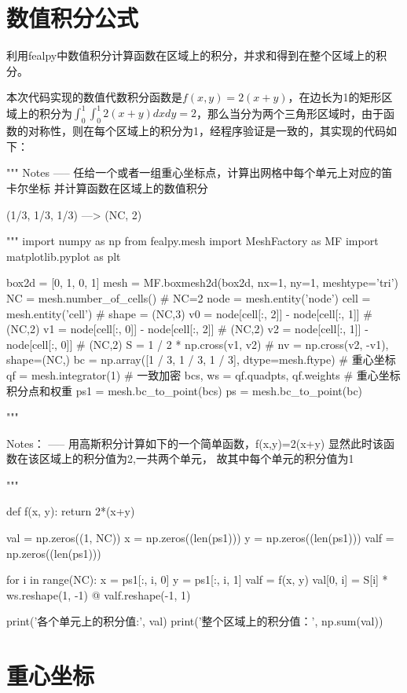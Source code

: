 \documentclass{article}
\begin{document}
\section{数值积分公式}

利用fealpy中数值积分计算函数在区域上的积分，并求和得到在整个区域上的积分。

本次代码实现的数值代数积分函数是$f(x,y)=2(x+y)$，在边长为1的矩形区域上的积分为$\int_0^1\int_0^1 2(x+y)dxdy=2$，那么当分为两个三角形区域时，由于函数的对称性，则在每个区域上的积分为1，经程序验证是一致的，其实现的代码如下：

\begin{python}
"""
Notes
-----
任给一个或者一组重心坐标点，计算出网格中每个单元上对应的笛卡尔坐标
并计算函数在区域上的数值积分

(1/3, 1/3, 1/3)   --->  (NC, 2)

"""
import numpy as np
from fealpy.mesh import MeshFactory as MF
import matplotlib.pyplot as plt

box2d = [0, 1, 0, 1]
mesh = MF.boxmesh2d(box2d, nx=1, ny=1, meshtype='tri')
NC = mesh.number_of_cells()  # NC=2
node = mesh.entity('node')
cell = mesh.entity('cell')  # shape = (NC,3)
v0 = node[cell[:, 2]] - node[cell[:, 1]]  # (NC,2)
v1 = node[cell[:, 0]] - node[cell[:, 2]]  # (NC,2)
v2 = node[cell[:, 1]] - node[cell[:, 0]]  # (NC,2)
S = 1 / 2 * np.cross(v1, v2)  # nv = np.cross(v2, -v1), shape=(NC,)
bc = np.array([1 / 3, 1 / 3, 1 / 3], dtype=mesh.ftype)  # 重心坐标
qf = mesh.integrator(1)  # 一致加密
bcs, ws = qf.quadpts, qf.weights  # 重心坐标积分点和权重
ps1 = mesh.bc_to_point(bcs)
ps = mesh.bc_to_point(bc)

"""

Notes：
-----
用高斯积分计算如下的一个简单函数，f(x,y)=2(x+y)
显然此时该函数在该区域上的积分值为2,一共两个单元，
故其中每个单元的积分值为1

"""


def f(x, y):
    return 2*(x+y)


val = np.zeros((1, NC))
x = np.zeros((len(ps1)))
y = np.zeros((len(ps1)))
valf = np.zeros((len(ps1)))

for i in range(NC):
    x = ps1[:, i, 0]
    y = ps1[:, i, 1]
    valf = f(x, y)
    val[0, i] = S[i] * ws.reshape(1, -1) @ valf.reshape(-1, 1)

print('各个单元上的积分值:', val)
print('整个区域上的积分值：', np.sum(val))
\end{python}

\section{重心坐标}
\end{document}
